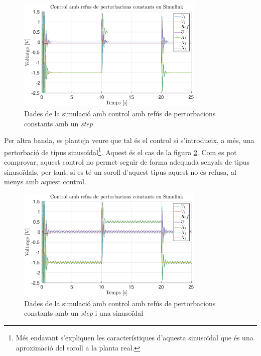 \documentclass[12pt,a4paper,final,twoside,openright]{report}
\begin{document}
\begin{figure}[ht]
\centering
\includegraphics[width=0.8\textwidth]{Imatges/pert_ct_all_sim_pols_imag_no_sin.eps}
\caption{Dades de la simulació amb control amb refús de pertorbacions constants amb un \textit{step}\label{fig:pert_ct_all_sim_pols_imag_no_sin}}
\end{figure}

Per altra banda, es planteja veure que tal és el control si s'introdueix, a més, una pertorbació de tipus sinusoïdal\footnote{Més endavant s'expliquen les característiques d'aquesta sinusoïdal que és una aproximació del soroll a la planta real.}. Aquest és el cas de la figura \ref{fig:pert_ct_all_sim_pols_imag_sin}. Com es pot comprovar, aquest control no permet seguir de forma adequada senyals de tipus sinusoïdals, per tant, si es té un soroll d'aquest tipus aquest no és refusa, al menys amb aquest control.

\begin{figure}[ht]
\centering
\includegraphics[width=0.8\textwidth]{Imatges/pert_ct_all_sim_pols_imag_sin.eps}
\caption{Dades de la simulació amb control amb refús de pertorbacions constants amb un \textit{step} i una sinusoïdal\label{fig:pert_ct_all_sim_pols_imag_sin}}
\end{figure}
\end{document}
